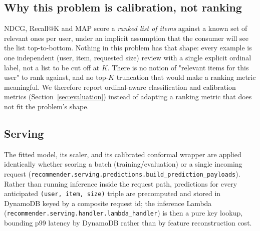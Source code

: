 \subsection{Why this problem is calibration, not ranking}
\label{sec:why-not-ranking}

NDCG, Recall@K and MAP score a \emph{ranked list of items} against a known
set of relevant ones per user, under an implicit assumption that the
consumer will see the list top-to-bottom. Nothing in this problem has that
shape: every example is one independent (user, item, requested size) review
with a single explicit ordinal label, not a list to be cut off at $K$. There
is no notion of "relevant items for this user" to rank against, and no
top-$K$ truncation that would make a ranking metric meaningful. We therefore
report ordinal-aware classification and calibration metrics
(Section~\ref{sec:evaluation}) instead of adapting a ranking metric that does
not fit the problem's shape.

\subsection{Serving}
\label{sec:methodology-serving}

The fitted model, its scaler, and its calibrated conformal wrapper are
applied identically whether scoring a batch (training/evaluation) or a
single incoming request
(\texttt{recommender.serving.predictions.build\_prediction\_payloads}).
Rather than running inference inside the request path, predictions for every
anticipated \texttt{(user, item, size)} triple are precomputed and stored in
DynamoDB keyed by a composite request id; the inference Lambda
(\texttt{recommender.serving.handler.lambda\_handler}) is then a pure key
lookup, bounding p99 latency by DynamoDB rather than by feature
reconstruction cost.
